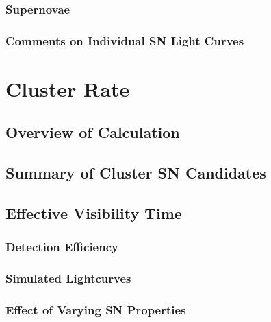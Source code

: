\documentclass[12pt]{ucthesis}
\begin{document}
\subsection{Supernovae} \label{sec:cands_sn}


\subsection{Comments on Individual SN Light Curves} 
\label{sec:cands_sncomments}



\chapter{Cluster Rate} \label{sec:clrate}

\section{Overview of Calculation} \label{sec:clrate_overview}


\section{Summary of Cluster SN Candidates} \label{sec:clrate_candsummary}



\section{Effective Visibility Time} \label{sec:ct}


\subsection{Detection Efficiency} \label{sec:ct_eff}


\subsection{Simulated Lightcurves} \label{sec:ct_mc}


\subsection{Effect of Varying SN Properties} \label{sec:ct_sys}

\end{document}
